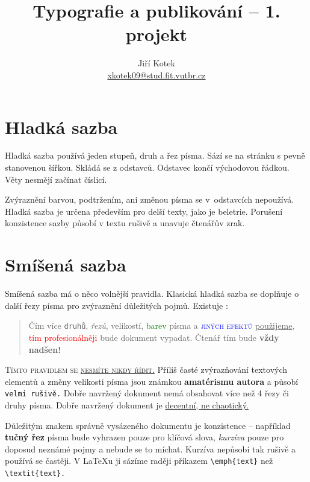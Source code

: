 \documentclass [10pt, a4paper, twocolumn] {article}
\title{Typografie a publikování -- 1. projekt}
\author{Jiří Kotek \\ \href{mailto:xkotek09@stud.fit.vutbr.cz}{xkotek09@stud.fit.vutbr.cz}}
\date{}
\begin{document}
\maketitle

\section{Hladká sazba}

Hladká sazba používá jeden stupeň, druh a řez písma.
Sází se na stránku s pevně stanovenou šířkou.
Skládá se z odstavců. Odstavec končí východovou řádkou.
Věty nesmějí začínat číslicí.

Zvýraznění barvou, podtržením, ani změnou písma se v~odstavcích nepoužívá.
Hladká sazba je určena především pro delší texty, jako je beletrie.
Porušení konzistence sazby působí v textu rušivě a unavuje čtenářův zrak.


\section{Smíšená sazba}

Smíšená sazba má o něco volnější pravidla.
Klasická hladká sazba se doplňuje o další řezy písma pro zvýraznění důležitých pojmů.
Existuje :

\begin{quote}
\hspace*{0.3cm} 
Čím více \texttt{druhů}, \textit{řezů}, {\tiny velikostí}, \textcolor{green}{barev} písma a \textsc {\textcolor {blue} {jiných efektů}} \underline{použijeme}, \textcolor {red} {tím profesionálněji} bude {\selectfont dokument} vypadat.
Čtenář tím bude \textbf{{\Huge vždy nadšen!}}

\end{quote} 

 \textsc{Tímto pravidlem se \underline{nesmíte nikdy řídit.}}
Příliš časté zvýrazňování textových elementů a změny {\scriptsize velikosti} písma jsou známkou \textbf{amatérismu autora} a působí \texttt{velmi rušivě.}
Dobře navržený dokument nemá obsahovat více než 4 řezy či druhy písma.
Dobře navržený dokument je \underline{decentní, ne chaotický.}

Důležitým znakem správně vysázeného dokumentu je konzistence -- například \textbf{tučný řez} písma bude vyhrazen pouze pro klíčová slova, \textit{kurzíva} pouze pro doposud neznámé pojmy a nebude se to míchat.
Kurzíva nepůsobí tak rušivě a používá se častěji.
V \LaTeX u ji sázíme raději příkazem  \verb|\emph{text}|   než   \verb|\textit{text}.|
  
\end{document}
